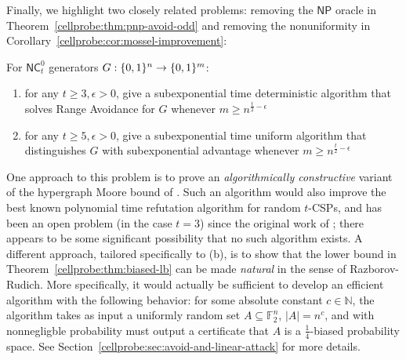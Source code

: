 Finally, we highlight two closely related problems: removing the $\mathsf{NP}$ oracle in Theorem~\ref{cellprobe:thm:pnp-avoid-odd} and removing the nonuniformity in Corollary~\ref{cellprobe:cor:mossel-improvement}:
\begin{problem}\label{cellprobe:prob:constructive-moore}
For $\mathsf{NC}^0_t$ generators $G:\{0,1\}^n \to \{0,1\}^m$:
\begin{enumerate}
    \item[(a)] for any $t\geq 3, \epsilon>0$, give a subexponential time deterministic algorithm that solves Range Avoidance for $G$ whenever $m \geq n^{\frac{t}{2} - \epsilon}$
    \item[(b)] for any $t \geq 5, \epsilon>0$, give a subexponential time uniform algorithm that distinguishes $G$ with subexponential advantage whenever $m \geq n^{\frac{t}{2}-\epsilon}$
\end{enumerate}
\end{problem}
One approach to this problem is to prove an \emph{algorithmically constructive} variant of the hypergraph Moore bound of \cite{smoothed,simpler-moore}. 
Such an algorithm would also improve the best known polynomial time refutation algorithm for random $t$-CSPs, and has been an open problem (in the case $t=3$) since the original work of \cite{FKO}; there appears to be some significant possibility that no such algorithm exists.
A different approach, tailored specifically to (b), is to show that the lower bound in Theorem~\ref{cellprobe:thm:biased-lb} can be made \emph{natural} in the sense of Razborov-Rudich. More specifically, it would actually be sufficient to develop an efficient algorithm with the following behavior: for some absolute constant $c \in\mathbb{N}$, the algorithm takes as input a uniformly random set $A \subseteq \mathbb{F}_2^n$, $|A|= n^c$, and with nonnegligble probability must output a certificate that $A$ is a $\frac{1}{4}$-biased probability space. See Section~\ref{cellprobe:sec:avoid-and-linear-attack} for more details.

